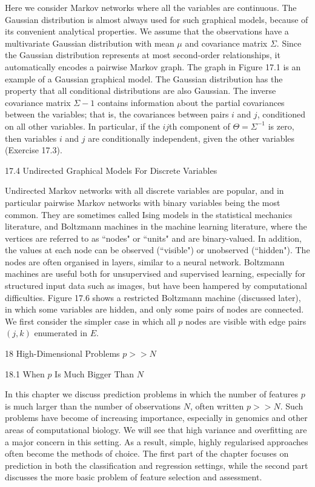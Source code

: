 Here we consider Markov networks where all the variables are continuous. The Gaussian distribution is almost always used for such graphical models, because of its convenient analytical properties. We assume that the observations have a multivariate Gaussian distribution with mean $\mu$ and covariance matrix $\Sigma$. Since the Gaussian distribution represents at most second-order relationships, it automatically encodes a pairwise Markov graph. The graph in Figure 17.1 is an example of a Gaussian graphical model. The Gaussian distribution has the property that all conditional distributions are also Gaussian. The inverse covariance matrix $\Sigma-1$ contains information about the partial covariances between the variables; that is, the covariances between pairs $i$ and $j$, conditioned on all other variables. In particular, if the $ij$th component of $\Theta = \Sigma^{-1}$ is zero, then variables $i$ and $j$ are conditionally independent, given the other variables (Exercise 17.3).

17.4 Undirected Graphical Models For Discrete Variables

Undirected Markov networks with all discrete variables are popular, and in particular pairwise Markov networks with binary variables being the most common. They are sometimes called Ising models in the statistical mechanics literature, and Boltzmann machines in the machine learning literature, where the vertices are referred to as ``nodes" or ``units" and are binary-valued. In addition, the values at each node can be observed (``visible") or unobserved (``hidden"). The nodes are often organised in layers, similar to a neural network. Boltzmann machines are useful both for unsupervised and supervised learning, especially for structured input data such as images, but have been hampered by computational difficulties. Figure 17.6 shows a restricted Boltzmann machine (discussed later), in which some variables are hidden, and only some pairs of nodes are connected. We first consider the simpler case in which all $p$ nodes are visible with edge pairs $(j,k)$ enumerated in $E$.

18 High-Dimensional Problems $p >> N$

18.1 When $p$ Is Much Bigger Than $N$

In this chapter we discuss prediction problems in which the number of
features $p$ is much larger than the number of observations $N$, often written $p >> N$. Such problems have become of increasing importance, especially in genomics and other areas of computational biology. We will see that high variance and overfitting are a major concern in this setting. As a result, simple, highly regularised approaches often become the methods of choice. The first part of the chapter focuses on prediction in both the classification and regression settings, while the second part discusses the more basic problem of feature selection and assessment.

